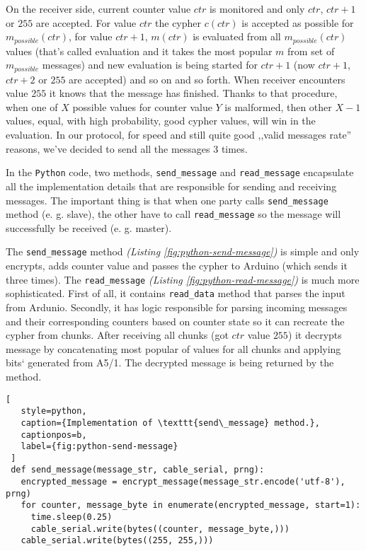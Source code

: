 On the receiver side, current counter value $ctr$ is monitored and only $ctr$, $ctr+1$ or $255$ are accepted. For value $ctr$ the cypher $c(ctr)$ is accepted as possible for $m_{possible}(ctr)$, for value $ctr+1$, $m(ctr)$ is evaluated from all $m_{possible}(ctr)$ values (that's called evaluation and it takes the most popular $m$ from set of $m_{possible}$ messages) and new evaluation is being started for $ctr+1$ (now $ctr+1$, $ctr+2$ or $255$ are accepted) and so on and so forth. When receiver encounters value $255$ it knows that the message has finished. Thanks to that procedure, when one of $X$ possible values for counter value $Y$ is malformed, then other $X - 1$ values, equal, with high probability, good cypher values, will win in the evaluation. In our protocol, for speed and still quite good ,,valid messages rate'' reasons, we've decided to send all the messages 3 times.

In the \texttt{Python} code, two methods, \texttt{send\_message} and
 \texttt{read\_message} encapsulate all the implementation details that are responsible for sending and receiving messages. The important thing is that when one party calls \texttt{send\_message} method (e. g. slave), the other have to call \texttt{read\_message} so the message will successfully be received (e. g. master).

 The \texttt{send\_message} method \textit{(Listing \ref{fig:python-send-message})} is simple and only encrypts, adds counter value and passes the cypher to Arduino (which sends it three times). The \texttt{read\_message} \textit{(Listing \ref{fig:python-read-message})} is much more sophisticated. First of all, it contains \texttt{read\_data} method that parses the input from Ardunio. Secondly, it has logic responsible for parsing incoming messages and their corresponding counters based on counter state so it can recreate the cypher from chunks. After receiving all chunks (got $ctr$ value $255$) it decrypts message by concatenating most popular of values for all chunks and applying bits` generated from A5/1. The decrypted message is being returned by the method.


 \begin{minipage}{\linewidth}
  \begin{lstlisting}[
   style=python,
   caption={Implementation of \texttt{send\_message} method.},
   captionpos=b,
   label={fig:python-send-message}
 ]
 def send_message(message_str, cable_serial, prng):
   encrypted_message = encrypt_message(message_str.encode('utf-8'), prng)
   for counter, message_byte in enumerate(encrypted_message, start=1):
     time.sleep(0.25)
     cable_serial.write(bytes((counter, message_byte,)))
   cable_serial.write(bytes((255, 255,)))
 \end{lstlisting}
 \end{minipage}


